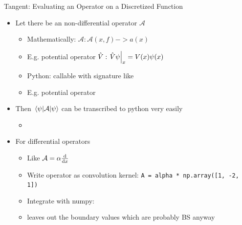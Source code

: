 
\begin{frame}[fragile]{Tangent: Evaluating an Operator on a Discretized Function}
%
\begin{itemize}
\item Let there be an non-differential operator $\mathcal{A}$
	\begin{itemize}
	\setlength\itemsep{3pt}
	\item Mathematically: $\mathcal{A}: \mathcal{A}(x, f) -> a(x)$
	\item E.\;g. potential operator $\hat{V}: \eval{\hat{V} \psi}_{x} = V(x) \psi(x)$
	\item Python: callable with signature like 
	\item E.\;g. potential operator 
	\end{itemize}
\item Then $\matrixel{\psi}{\mathcal{A}}{\psi}$ can be transcribed to python very easily
	\begin{itemize}
	\item {}
	\end{itemize}
\item For differential operators
	\begin{itemize}
	\item Like $\mathcal{A} = \alpha \dv{x}$
	\item Write operator as convolution kernel: \texttt{A = alpha * np.array([1, -2, 1])}
	\item Integrate with numpy: 
	\item {} leaves out the boundary values which are probably BS anyway
	\end{itemize}
\end{itemize}
%
\end{frame}


